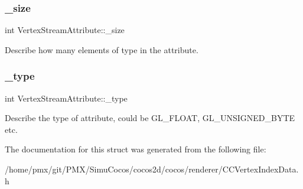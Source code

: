 \subsubsection{\texorpdfstring{\+\_\+size}{\_size}}
{\footnotesize\ttfamily int Vertex\+Stream\+Attribute\+::\+\_\+size}

Describe how many elements of type in the attribute. \mbox{\label{structVertexStreamAttribute_a3a1c3011d9fe0c45c43655e0d98bc908}} 
\subsubsection{\texorpdfstring{\+\_\+type}{\_type}}
{\footnotesize\ttfamily int Vertex\+Stream\+Attribute\+::\+\_\+type}

Describe the type of attribute, could be G\+L\+\_\+\+F\+L\+O\+AT, G\+L\+\_\+\+U\+N\+S\+I\+G\+N\+E\+D\+\_\+\+B\+Y\+TE etc. 

The documentation for this struct was generated from the following file\+:\begin{DoxyCompactItemize}
\item 
/home/pmx/git/\+P\+M\+X/\+Simu\+Cocos/cocos2d/cocos/renderer/C\+C\+Vertex\+Index\+Data.\+h\end{DoxyCompactItemize}
